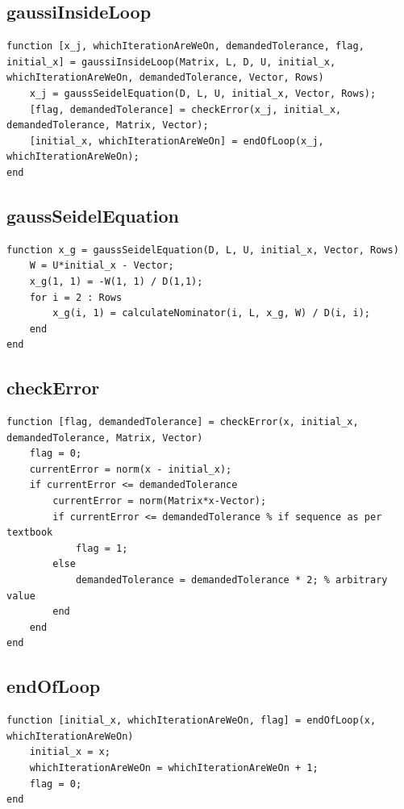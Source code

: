 \subsection{gaussiInsideLoop}
\begin{simplechar}
\begin{lstlisting}
function [x_j, whichIterationAreWeOn, demandedTolerance, flag, initial_x] = gaussiInsideLoop(Matrix, L, D, U, initial_x, whichIterationAreWeOn, demandedTolerance, Vector, Rows)
    x_j = gaussSeidelEquation(D, L, U, initial_x, Vector, Rows);
    [flag, demandedTolerance] = checkError(x_j, initial_x, demandedTolerance, Matrix, Vector);
    [initial_x, whichIterationAreWeOn] = endOfLoop(x_j, whichIterationAreWeOn);
end
\end{lstlisting}
\end{simplechar}

\newpage
\subsection{gaussSeidelEquation}
\begin{simplechar}
\begin{lstlisting}
function x_g = gaussSeidelEquation(D, L, U, initial_x, Vector, Rows)
    W = U*initial_x - Vector;
    x_g(1, 1) = -W(1, 1) / D(1,1);
    for i = 2 : Rows
        x_g(i, 1) = calculateNominator(i, L, x_g, W) / D(i, i);
    end
end
\end{lstlisting}
\end{simplechar}

\subsection{checkError}
\begin{simplechar}
\begin{lstlisting}
function [flag, demandedTolerance] = checkError(x, initial_x, demandedTolerance, Matrix, Vector)
    flag = 0;
    currentError = norm(x - initial_x);
    if currentError <= demandedTolerance
        currentError = norm(Matrix*x-Vector);
        if currentError <= demandedTolerance % if sequence as per textbook
            flag = 1;
        else
            demandedTolerance = demandedTolerance * 2; % arbitrary value
        end
    end
end
\end{lstlisting}
\end{simplechar}

\newpage
\subsection{endOfLoop}
\begin{simplechar}
\begin{lstlisting}
function [initial_x, whichIterationAreWeOn, flag] = endOfLoop(x, whichIterationAreWeOn)
    initial_x = x;
    whichIterationAreWeOn = whichIterationAreWeOn + 1;
    flag = 0;
end
\end{lstlisting}
\end{simplechar}

